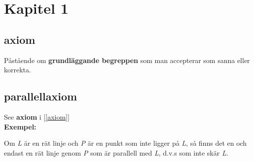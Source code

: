 \section{Kapitel 1} 
\subsection{\textbf{axiom}}\cite{axiom}\label{axiom} 
    Påstående om \textbf{grundläggande begreppen} som man accepterar som sanna eller korrekta.
\subsection{\textbf{parallellaxiom}}\label{parallellaxiom} 
    See \textbf{axiom} i [\ref{axiom}]
    \\\textbf{Exempel:}\par
    \begin{adjustwidth}{10 mm}{10 mm}
        Om \textsl{L} är en rät linje och \textsl{P} är en punkt som inte ligger på \textsl{L}, så finns det en och endast en rät linje genom \textsl{P} som är parallell med \textsl{L}, d.v.s som inte skär \textsl{L}.
    \end{adjustwidth}



